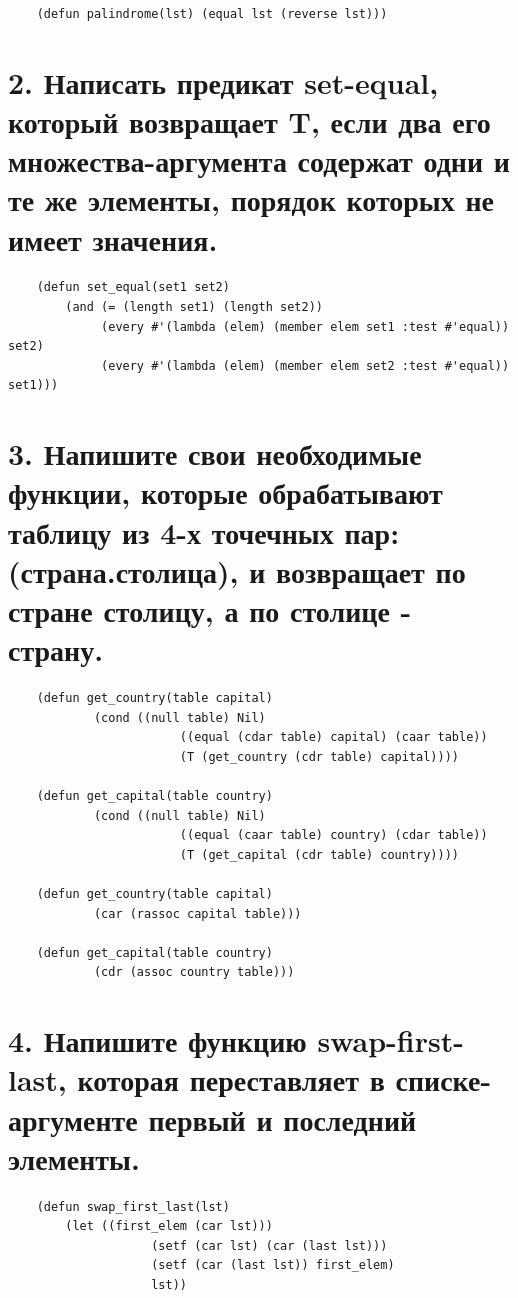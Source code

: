 \documentclass[12pt]{report}
\begin{document}
\begin{lstlisting}
	(defun palindrome(lst) (equal lst (reverse lst)))
\end{lstlisting}

\section*{2. Написать предикат set-equal, который возвращает T, если два его множества-аргумента содержат одни и те же элементы, порядок которых не имеет значения.}

\begin{lstlisting}
	(defun set_equal(set1 set2)
		(and (= (length set1) (length set2))
			 (every #'(lambda (elem) (member elem set1 :test #'equal)) set2)
			 (every #'(lambda (elem) (member elem set2 :test #'equal)) set1)))
\end{lstlisting}

\section*{3. Напишите свои необходимые функции, которые обрабатывают таблицу из 4-х точечных пар: (страна.столица), и возвращает по стране столицу, а по столице - страну.}

\begin{lstlisting}
	(defun get_country(table capital)
			(cond ((null table) Nil)
						((equal (cdar table) capital) (caar table))
						(T (get_country (cdr table) capital))))
	
	(defun get_capital(table country)
			(cond ((null table) Nil)
						((equal (caar table) country) (cdar table))
						(T (get_capital (cdr table) country))))
						
	(defun get_country(table capital)
			(car (rassoc capital table)))
	
	(defun get_capital(table country)
			(cdr (assoc country table)))
\end{lstlisting}

\clearpage

\section*{4. Напишите функцию swap-first-last, которая переставляет в списке-аргументе первый и последний элементы.}

\begin{lstlisting}
	(defun swap_first_last(lst)
		(let ((first_elem (car lst))) 
					(setf (car lst) (car (last lst)))
					(setf (car (last lst)) first_elem)
					lst))
\end{lstlisting}
\end{document}
